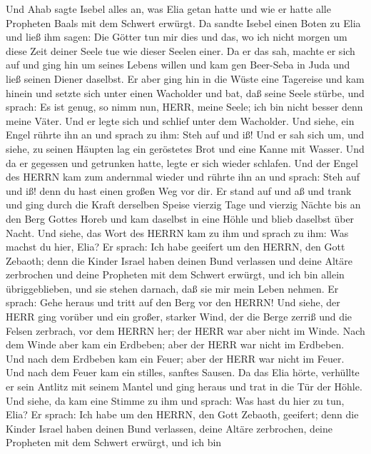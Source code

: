  Und Ahab sagte Isebel alles an, was Elia getan hatte und
wie er hatte alle Propheten Baals mit dem Schwert erwürgt. 
Da sandte Isebel einen Boten zu Elia und ließ ihm sagen: Die Götter tun
mir dies und das, wo ich nicht morgen um diese Zeit deiner Seele tue wie
dieser Seelen einer.  Da er das sah, machte er sich auf und
ging hin um seines Lebens willen und kam gen Beer-Seba in Juda und ließ
seinen Diener daselbst.  Er aber ging hin in die Wüste eine
Tagereise und kam hinein und setzte sich unter einen Wacholder und bat,
daß seine Seele stürbe, und sprach: Es ist genug, so nimm nun, HERR,
meine Seele; ich bin nicht besser denn meine Väter.  Und er
legte sich und schlief unter dem Wacholder. Und siehe, ein Engel rührte
ihn an und sprach zu ihm: Steh auf und iß!  Und er sah sich
um, und siehe, zu seinen Häupten lag ein geröstetes Brot und eine Kanne
mit Wasser. Und da er gegessen und getrunken hatte, legte er sich wieder
schlafen.  Und der Engel des HERRN kam zum andernmal wieder
und rührte ihn an und sprach: Steh auf und iß! denn du hast einen großen
Weg vor dir.  Er stand auf und aß und trank und ging durch
die Kraft derselben Speise vierzig Tage und vierzig Nächte bis an den
Berg Gottes Horeb  und kam daselbst in eine Höhle und blieb
daselbst über Nacht. Und siehe, das Wort des HERRN kam zu ihm und sprach
zu ihm: Was machst du hier, Elia?  Er sprach: Ich habe
geeifert um den HERRN, den Gott Zebaoth; denn die Kinder Israel haben
deinen Bund verlassen und deine Altäre zerbrochen und deine Propheten
mit dem Schwert erwürgt, und ich bin allein übriggeblieben, und sie
stehen darnach, daß sie mir mein Leben nehmen.  Er sprach:
Gehe heraus und tritt auf den Berg vor den HERRN! Und siehe, der HERR
ging vorüber und ein großer, starker Wind, der die Berge zerriß und die
Felsen zerbrach, vor dem HERRN her; der HERR war aber nicht im Winde.
Nach dem Winde aber kam ein Erdbeben; aber der HERR war nicht im
Erdbeben.  Und nach dem Erdbeben kam ein Feuer; aber der
HERR war nicht im Feuer. Und nach dem Feuer kam ein stilles, sanftes
Sausen.  Da das Elia hörte, verhüllte er sein Antlitz mit
seinem Mantel und ging heraus und trat in die Tür der Höhle. Und siehe,
da kam eine Stimme zu ihm und sprach: Was hast du hier zu tun, Elia?
 Er sprach: Ich habe um den HERRN, den Gott Zebaoth,
geeifert; denn die Kinder Israel haben deinen Bund verlassen, deine
Altäre zerbrochen, deine Propheten mit dem Schwert erwürgt, und ich bin
